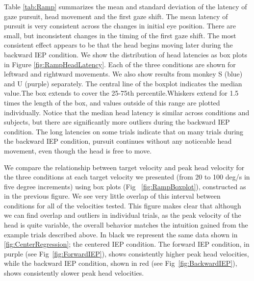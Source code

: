 \documentclass[12pt]{article}
\begin{document}
Table \ref{tab:Ramp} summarizes the mean and standard deviation of the latency of gaze pursuit, head movement and the first gaze shift. The mean latency of pursuit is very consistent across the changes in initial eye position. There are small, but inconsistent changes in the timing of the first gaze shift. The most consistent effect appears to be that the head begins moving later during the backward IEP condition. We show the distribution of head latencies as box plots in Figure \ref{fig:RampHeadLatency}. Each of the three conditions are shown for leftward and rightward movements. We also show results from monkey S (blue) and U (purple) separately. The central line of the boxplot indicates the median value.The box extends to cover the 25-75th percentile.Whiskers extend for 1.5 times the length of the box, and values outside of this range are plotted individually. Notice that the median head latency is similar across conditions and subjects, but there are significantly more outliers during the backward IEP condition. The long latencies on some trials indicate that on many trials during the backward IEP condition, pursuit continues without any noticeable head movement, even though the head is free to move. 

We compare the relationship between target velocity and peak head velocity for the three conditions at each target velocity we presented (from 20 to 100 deg/s in five degree increments) using box plots (Fig ~\ref{fig:RampBoxplot}), constructed as in the previous figure. We see very little overlap of this interval between conditions for all of the velocities tested. This figure makes clear that although we can find overlap and outliers in individual trials, as the peak velocity of the head is quite variable, the overall behavior matches the intuition gained from the example trials described above. In black we represent the same data shown in \ref{fig:CenterRegression}; the centered IEP condition. The forward IEP condition, in purple (see Fig~\ref{fig:ForwardIEP}), shows consistently higher peak head velocities, while the backward IEP condition, shown in red (see Fig~\ref{fig:BackwardIEP}), shows consistently slower peak head velocities. 
\end{document}

